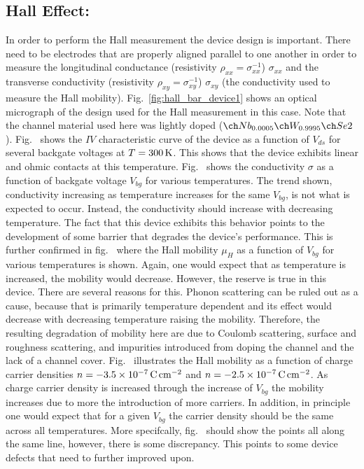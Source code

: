 \subsection{Hall Effect: \lightlyfive}\label{subsec:hall_lightly}
In order to perform the Hall measurement the device design is important. There need to be electrodes that are properly aligned parallel to one another in order to measure the longitudinal conductance (resistivity $\rho_{xx}=\sigma_{xx}^{-1}$) $\sigma_{xx}$ and the transverse conductivity (resistivity $\rho_{xy}=\sigma_{xy}^{-1}$) $\sigma_{xy}$ (the conductivity used to measure the Hall mobility). Fig.~\ref{fig:hall_bar_device1} shows an optical micrograph of the design used for the Hall measurement in this case. Note that the channel material used here was lightly doped  ($\lightlyfive$). Fig.~ shows the $IV$ characteristic curve of the device as a function of $V_{ds}$ for several backgate voltages at $T=300\,\mathrm{K}$. This shows that the device exhibits linear and ohmic contacts at this temperature. Fig.~ shows the conductivity $\sigma$ as a function of backgate voltage $V_{bg}$ for various temperatures. The trend shown, conductivity increasing as temperature increases for the same $V_{bg}$, is not what is expected to occur. Instead, the conductivity should increase with decreasing temperature. The fact that this device exhibits this behavior points to the development of some barrier that degrades the device's performance. This is further confirmed in fig.~ where the Hall mobility $\mu_H$ as a function of $V_{bg}$ for various temperatures is shown. Again, one would expect that as temperature is increased, the mobility would decrease. However, the reserve is true in this device. There are several reasons for this. Phonon scattering can be ruled out as a cause, because that is primarily temperature dependent and its effect would decrease with decreasing temperature raising the mobility. Therefore, the resulting degradation of mobility here are due to Coulomb scattering, surface and roughness scattering, and impurities introduced from doping the channel and the lack of a \hbn channel cover. Fig.~ illustrates the Hall mobility as a function of charge carrier densities $n=-3.5\times 10^{-7}\,\mathrm{C}\,\mathrm{cm}^{-2}$ and $n=-2.5\times 10^{-7}\,\mathrm{C}\,\mathrm{cm}^{-2}$. As charge carrier density is increased through the increase of $V_{bg}$ the mobility increases due to more the introduction of more carriers. In addition, in principle one would expect that for a given $V_{bg}$ the carrier density should be the same across all temperatures. More specifcally, fig.~ should show the points all along the same line, however, there is some discrepancy. This points to some device defects that need to further improved upon.

